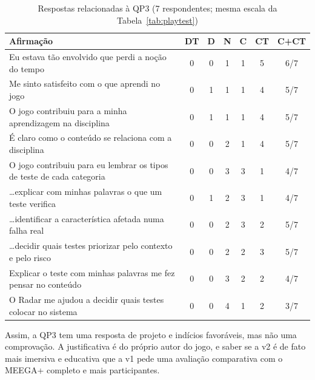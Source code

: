 \begin{table}[ht]
  \centering
  \caption{Respostas relacionadas à QP3 (7 respondentes; mesma escala da Tabela~\ref{tab:playtest})}
  \label{tab:qp3}
  \scriptsize
  \begin{tabularx}{\linewidth}{>{\raggedright\arraybackslash}X c c c c c c}
    \toprule
    Afirmação & DT & D & N & C & CT & C+CT \\
    \midrule
    Eu estava tão envolvido que perdi a noção do tempo & 0 & 0 & 1 & 1 & 5 & 6/7 \\
    Me sinto satisfeito com o que aprendi no jogo & 0 & 1 & 1 & 1 & 4 & 5/7 \\
    O jogo contribuiu para a minha aprendizagem na disciplina & 0 & 1 & 1 & 1 & 4 & 5/7 \\
    É claro como o conteúdo se relaciona com a disciplina & 0 & 0 & 2 & 1 & 4 & 5/7 \\
    O jogo contribuiu para eu lembrar os tipos de teste de cada categoria & 0 & 0 & 3 & 3 & 1 & 4/7 \\
    \ldots explicar com minhas palavras o que um teste verifica & 0 & 1 & 2 & 3 & 1 & 4/7 \\
    \ldots identificar a característica afetada numa falha real & 0 & 0 & 2 & 3 & 2 & 5/7 \\
    \ldots decidir quais testes priorizar pelo contexto e pelo risco & 0 & 0 & 2 & 2 & 3 & 5/7 \\
    Explicar o teste com minhas palavras me fez pensar no conteúdo & 0 & 0 & 3 & 2 & 2 & 4/7 \\
    O Radar me ajudou a decidir quais testes colocar no sistema & 0 & 0 & 4 & 1 & 2 & 3/7 \\
    \bottomrule
  \end{tabularx}
\end{table}

Assim, a QP3 tem uma resposta de projeto e indícios favoráveis, mas não uma comprovação. A justificativa é do
próprio autor do jogo, e saber se a v2 é de fato mais imersiva e educativa que a v1 pede uma avaliação comparativa
com o MEEGA+ completo e mais participantes.

\subsection{\texorpdfstring{}{Os problemas da v1 na v2}}
\label{sec:sintese}

